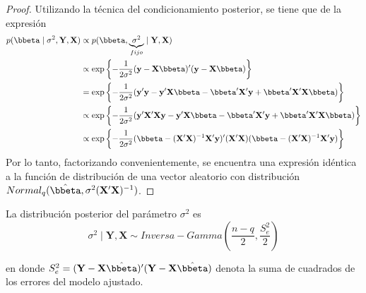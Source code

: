 \begin{proof}
Utilizando la técnica del condicionamiento posterior, se tiene que de la expresión
\begin{align*}
p(\bbeta \mid \sigma^2,\mathbf{Y},\mathbf{X})&\propto p(\bbeta,\underbrace{\sigma^2}_{fijo} \mid \mathbf{Y},\mathbf{X})\\
&\propto \exp\left\{-\frac{1}{2\sigma^2}(\mathbf{y}-\mathbf{X}\bbeta)'(\mathbf{y}-\mathbf{X}\bbeta)\right\}\\
&= \exp\left\{-\frac{1}{2\sigma^2}(\mathbf{y}'\mathbf{y}-\mathbf{y}'\mathbf{X}\bbeta
-\bbeta'\mathbf{X}'\mathbf{y}+\bbeta'\mathbf{X}'\mathbf{X}\bbeta)\right\}\\
&\propto \exp\left\{-\frac{1}{2\sigma^2}(\mathbf{y}'\mathbf{X}'\mathbf{X}\mathbf{y}-\mathbf{y}'\mathbf{X}\bbeta
-\bbeta'\mathbf{X}'\mathbf{y}+\bbeta'\mathbf{X}'\mathbf{X}\bbeta)\right\}\\
&\propto \exp\left\{-\frac{1}{2\sigma^2}(\bbeta-(\mathbf{X}'\mathbf{X})^{-1}\mathbf{X}'\mathbf{y})'
(\mathbf{X}'\mathbf{X})(\bbeta-(\mathbf{X}'\mathbf{X})^{-1}\mathbf{X}'\mathbf{y})\right\}
\end{align*}
Por lo tanto, factorizando convenientemente, se encuentra una expresión idéntica a la
función de distribución de una vector aleatorio con distribución $Normal_q(\hat{\bbeta}, \sigma^2(\mathbf{X}'\mathbf{X})^{-1})$.
\end{proof}

\begin{Res}
La distribución posterior del parámetro $\sigma^2$ es
\begin{equation*}
\sigma^2 \mid  \mathbf{Y}, \mathbf{X}
\sim Inversa-Gamma \left(\frac{n-q}{2},\frac{S^2_e}{2}\right)
\end{equation*}

en donde $S^2_e=(\mathbf{Y}-\mathbf{X}\hat{\bbeta})'(\mathbf{Y}-\mathbf{X}\hat{\bbeta})$ denota la suma de cuadrados de los errores del modelo ajustado.
\end{Res}


